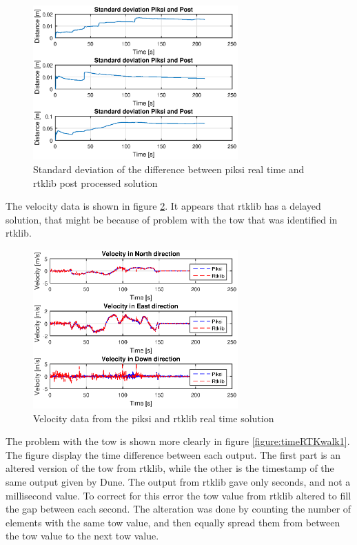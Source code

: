 \begin{figure}[H]
	\centering
		\includegraphics[width=0.7\textwidth]{figs/plots/stdpiksipost.eps}
		\caption{Standard deviation of the difference between piksi real time and rtklib post processed solution}
		\label{figure:stdPiksi}
\end{figure}
The velocity data is shown in figure \ref{figure:VelocityWalk1}. It appears that rtklib has a delayed solution, that might be because of problem with the \gls{tow} that was identified in rtklib.
\begin{figure}[H]
	\centering
		\includegraphics[width=0.7\textwidth]{figs/plots/velocityWalk1.eps}
		\caption{Velocity data from the piksi and rtklib real time solution}
		\label{figure:VelocityWalk1}
\end{figure}
The problem with the \gls{tow} is shown more clearly in figure \ref{figure:timeRTKwalk1}. The figure display the time difference between each output. The first part is an altered version of the \gls{tow} from rtklib, while the other is the timestamp of the same output given by Dune. The output from rtklib gave only seconds, and not a millisecond value. To correct for this error the \gls{tow} value from rtklib altered to fill the gap between each second. The alteration was done by counting the number of elements with the same \gls{tow} value, and then equally spread them from between the \gls{tow} value to the next \gls{tow} value.

